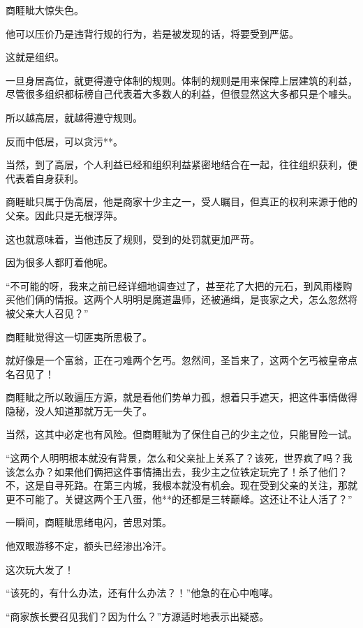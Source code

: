 
\begin{this_body}

商睚眦大惊失色。

他可以压价乃是违背行规的行为，若是被发现的话，将要受到严惩。

这就是组织。

一旦身居高位，就更得遵守体制的规则。体制的规则是用来保障上层建筑的利益，尽管很多组织都标榜自己代表着大多数人的利益，但很显然这大多都只是个噱头。

所以越高层，就越得遵守规则。

反而中低层，可以贪污**。

当然，到了高层，个人利益已经和组织利益紧密地结合在一起，往往组织获利，便代表着自身获利。

商睚眦只属于伪高层，他是商家十少主之一，受人瞩目，但真正的权利来源于他的父亲。因此只是无根浮萍。

这也就意味着，当他违反了规则，受到的处罚就更加严苛。

因为很多人都盯着他呢。

“不可能的呀，我来之前已经详细地调查过了，甚至花了大把的元石，到风雨楼购买他们俩的情报。这两个人明明是魔道蛊师，还被通缉，是丧家之犬，怎么忽然将被父亲大人召见？”

商睚眦觉得这一切匪夷所思极了。

就好像是一个富翁，正在刁难两个乞丐。忽然间，圣旨来了，这两个乞丐被皇帝点名召见了！

商睚眦之所以敢逼压方源，就是看他们势单力孤，想着只手遮天，把这件事情做得隐秘，没人知道那就万无一失了。

当然，这其中必定也有风险。但商睚眦为了保住自己的少主之位，只能冒险一试。

“这两个人明明根本就没有背景，怎么和父亲扯上关系了？该死，世界疯了吗？我该怎么办？如果他们俩把这件事情捅出去，我少主之位铁定玩完了！杀了他们？不，这是自寻死路。在第三内城，我根本就没有机会。现在受到父亲的关注，那就更不可能了。关键这两个王八蛋，他**的还都是三转巅峰。这还让不让人活了？”

一瞬间，商睚眦思绪电闪，苦思对策。

他双眼游移不定，额头已经渗出冷汗。

这次玩大发了！

“该死的，有什么办法，还有什么办法？！”他急的在心中咆哮。

“商家族长要召见我们？因为什么？”方源适时地表示出疑惑。


\end{this_body}
